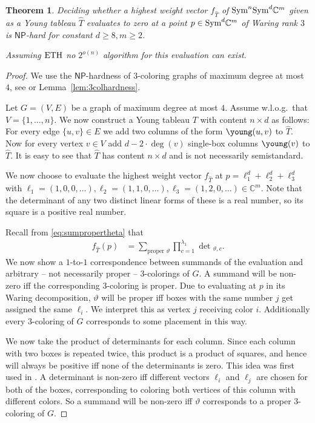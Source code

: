 \documentclass[10pt,a4paper]{article}
\numberwithin{equation}{section}
\newtheorem{theorem}[equation]{Theorem}
\theoremstyle{definition}
\newcommand{\Sym}{\textup{Sym}}
\newcommand{\IC}{\mathbb{C}}
\newcommand{\NP}{\ensuremath{\mathsf{NP}}}
\newcommand{\ETH}{\ensuremath{\textup{ETH}}}
\begin{document}
\begin{theorem}
    \label{thm:evaluationhardness}
    Deciding whether a highest weight vector $f_{\hat{T}}$ of $\Sym^n\Sym^d \IC^m$ given as a Young tableau $\hat{T}$ evaluates to zero at a point $p \in \Sym^d \IC^m$ of Waring rank $3$ is $\NP$-hard for constant $d \geq 8, m \geq 2$.

    Assuming $\ETH$ no $2^{o(n)}$ algorithm for this evaluation can exist.
\end{theorem}
\begin{proof}
    We use the $\NP$-hardness of $3$-coloring graphs of maximum degree at most $4$, see \cite{DBLP:journals/tcs/GareyJS76} or Lemma~\ref{lem:3colhardness}.

    Let $G = (V, E)$ be a graph of maximum degree at most $4$.
    Assume w.l.o.g.\ that $V = \{1, \ldots, n\}$.
    We now construct a Young tableau $T$ with content $n \times d$ as follows:
    For every edge $\{u,v\} \in E$ we add two columns of the form {\scriptsize $\young(u,v)$} to $\hat{T}$.
    Now for every vertex $v \in V$ add $d-2\cdot\deg(v)$ single-box columns {$\young(v)$} to $\hat{T}$.
    It is easy to see that $\hat{T}$ has content $n \times d$ and is not necessarily semistandard.

    We now choose to evaluate the highest weight vector $f_{\hat{T}}$ at $p = \ell_1^d + \ell_2^d + \ell_3^d$ with $\ell_1 = (1, 0, 0, \ldots), \ell_2 = (1, 1, 0, \ldots), \ell_3 = (1, 2, 0, \ldots) \in \IC^m$.
    Note that the determinant of any two distinct linear forms of these is a real number, so its square is a positive real number.

    Recall from \eqref{eq:sumpropertheta} that
\begin{align*}
    f_{\hat{T}}(p) &= \sum_{\text{proper\ }\vartheta} \prod_{c = 1}^{\lambda_1}\det{}_{\vartheta,c}.
\end{align*}
    We now show a $1$-to-$1$ correspondence between summands of the evaluation and arbitrary -- not necessarily proper -- $3$-colorings of $G$.
    A summand will be non-zero iff the corresponding $3$-coloring is proper.
%
    Due to evaluating at $p$ in its Waring decomposition, $\vartheta$ will be proper iff boxes with the same number $j$ get assigned the same $\ell_i$.
    We interpret this as vertex $j$ receiving color $i$.
    Additionally every $3$-coloring of $G$ corresponds to some placement in this way.

    We now take the product of determinants for each column.
    Since each column with two boxes is repeated twice, this product is a product of squares, and hence will always be positive iff none of the determinants is zero. This idea was first used in \cite{bci:10}.
    A determinant is non-zero iff different vectors $\ell_i$ and $\ell_j$ are chosen for both of the boxes, corresponding to coloring both vertices of this column with different colors.
    So a summand will be non-zero iff $\vartheta$ corresponds to a proper $3$-coloring of $G$.


\end{proof}
\end{document}

